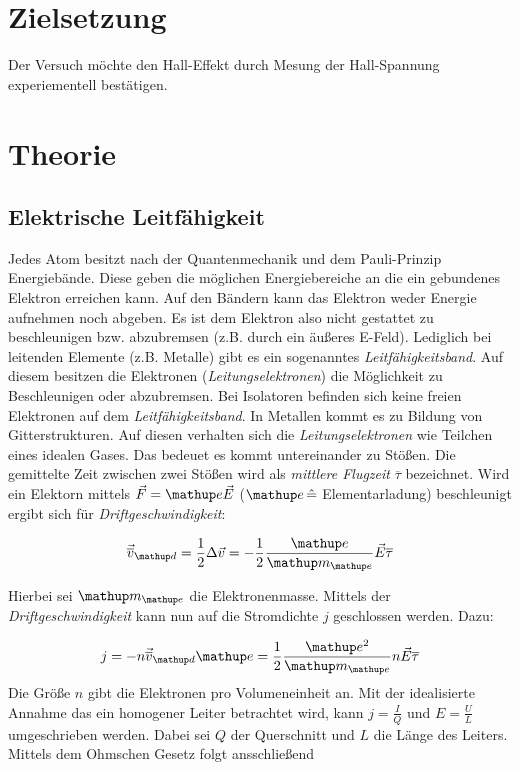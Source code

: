 \section*{Zielsetzung}
Der Versuch möchte den Hall-Effekt durch Mesung der 
Hall-Spannung experiementell bestätigen.

\section{Theorie}

\subsection{Elektrische Leitfähigkeit}
Jedes Atom besitzt nach der Quantenmechanik und dem Pauli-Prinzip 
Energiebände.
Diese geben die möglichen Energiebereiche an die ein gebundenes Elektron 
erreichen kann. Auf den Bändern kann das Elektron weder 
Energie aufnehmen noch abgeben. Es ist dem Elektron also 
nicht gestattet zu beschleunigen bzw. abzubremsen (z.B. durch ein äußeres E-Feld).
Lediglich bei leitenden Elemente (z.B. Metalle) gibt es ein sogenanntes \emph{Leitfähigkeitsband}.
Auf diesem besitzen die Elektronen (\emph{Leitungselektronen}) die Möglichkeit zu Beschleunigen oder abzubremsen.
Bei Isolatoren befinden sich keine freien Elektronen auf dem \emph{Leitfähigkeitsband}.
In Metallen kommt es zu Bildung von Gitterstrukturen. 
Auf diesen verhalten sich die \emph{Leitungselektronen} wie Teilchen eines idealen Gases.
Das bedeuet es kommt untereinander zu Stößen.
Die gemittelte Zeit zwischen zwei Stößen wird als \emph{mittlere Flugzeit} $\overline{\tau}$ bezeichnet.
Wird ein Elektorn mittels $\vec{F}=\map{e}\vec{E}$ ($\map{e}\, \hat{=}$ Elementarladung) beschleunigt 
ergibt sich für \emph{Driftgeschwindigkeit}:

\begin{equation}
\label{eq:drift_v}
\vec{\overline{v}}\ua{d}=\frac{1}{2}\Delta\vec{v}=-\frac{1}{2}\frac{\map{e}}{\map{m}\ua{e}}\vec{E}\overline{\tau}
\end{equation}

Hierbei sei $\map{m}\ua{e}$ die Elektronenmasse.
Mittels der \emph{Driftgeschwindigkeit} kann nun auf die Stromdichte $j$ geschlossen werden. Dazu:

\begin{equation}
\label{eq:stromdicht}
j=-n\vec{\overline{v}}\ua{d}\map{e}=\frac{1}{2}\frac{\map{e^2}}{\map{m}\ua{e}}n\vec{E}\overline{\tau}
\end{equation}
Die Größe $n$ gibt die Elektronen pro Volumeneinheit an.
Mit der idealisierte Annahme das ein homogener Leiter betrachtet wird, kann 
$j=\frac{I}{Q}$ und $E=\frac{U}{L}$ umgeschrieben werden.
Dabei sei $Q$ der Querschnitt und $L$ die Länge des Leiters.
Mittels dem Ohmschen Gesetz folgt ansschließend

